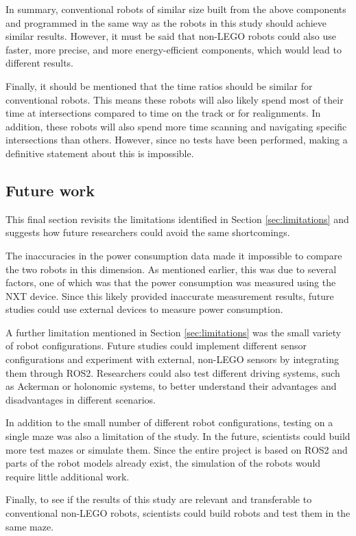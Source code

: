 In summary, conventional robots of similar size built from the above components and programmed in the same way as the robots in this study should achieve similar results. However, it must be said that non-LEGO robots could also use faster, more precise, and more energy-efficient components, which would lead to different results.

Finally, it should be mentioned that the time ratios should be similar for conventional robots. This means these robots will also likely spend most of their time at intersections compared to time on the track or for realignments. In addition, these robots will also spend more time scanning and navigating specific intersections than others. However, since no tests have been performed, making a definitive statement about this is impossible.


\subsection{Future work}

This final section revisits the limitations identified in Section \ref{sec:limitations} and suggests how future researchers could avoid the same shortcomings.

The inaccuracies in the power consumption data made it impossible to compare the two robots in this dimension. As mentioned earlier, this was due to several factors, one of which was that the power consumption was measured using the NXT device. Since this likely provided inaccurate measurement results, future studies could use external devices to measure power consumption.

A further limitation mentioned in Section \ref{sec:limitations} was the small variety of robot configurations. Future studies could implement different sensor configurations and experiment with external, non-LEGO sensors by integrating them through ROS2. Researchers could also test different driving systems, such as Ackerman or holonomic systems, to better understand their advantages and disadvantages in different scenarios.

In addition to the small number of different robot configurations, testing on a single maze was also a limitation of the study. In the future, scientists could build more test mazes or simulate them. Since the entire project is based on ROS2 and parts of the robot models already exist, the simulation of the robots would require little additional work.

Finally, to see if the results of this study are relevant and transferable to conventional non-LEGO robots, scientists could build robots and test them in the same maze.